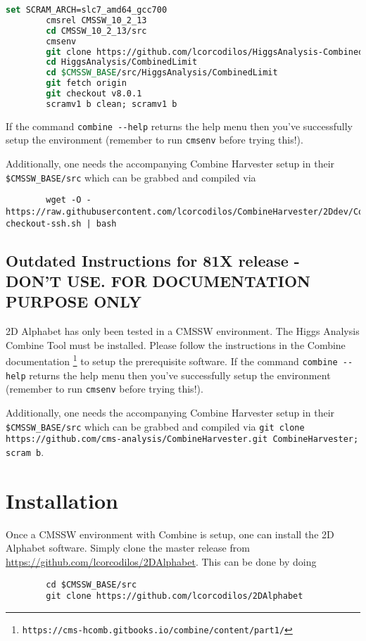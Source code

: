 \documentclass[letter]{article}
\begin{document}
    \begin{lstlisting}[language=csh]
        set SCRAM_ARCH=slc7_amd64_gcc700
        cmsrel CMSSW_10_2_13
        cd CMSSW_10_2_13/src
        cmsenv
        git clone https://github.com/lcorcodilos/HiggsAnalysis-CombinedLimit.git HiggsAnalysis/CombinedLimit
        cd HiggsAnalysis/CombinedLimit
        cd $CMSSW_BASE/src/HiggsAnalysis/CombinedLimit
        git fetch origin
        git checkout v8.0.1
        scramv1 b clean; scramv1 b
    \end{lstlisting}

    If the command \verb"combine --help" returns the help menu then you've successfully setup the environment (remember to run \verb"cmsenv" before trying this!).

    Additionally, one needs the accompanying Combine Harvester setup in their \verb"$CMSSW_BASE/src" which can be grabbed and compiled via 

    \begin{lstlisting}
        wget -O - https://raw.githubusercontent.com/lcorcodilos/CombineHarvester/2Ddev/CombineTools/scripts/sparse-checkout-ssh.sh | bash
    \end{lstlisting}

    \subsection{Outdated Instructions for 81X release - DON'T USE. FOR DOCUMENTATION PURPOSE ONLY}
    2D Alphabet has only been tested in a CMSSW environment. The Higgs Analysis Combine Tool must be installed. Please follow the instructions in the Combine documentation \footnote{\verb"https://cms-hcomb.gitbooks.io/combine/content/part1/"} to setup the prerequisite software. If the command \verb"combine --help" returns the help menu then you've successfully setup the environment (remember to run \verb"cmsenv" before trying this!).

    Additionally, one needs the accompanying Combine Harvester setup in their \verb"$CMSSW_BASE/src" which can be grabbed and compiled via \verb"git clone https://github.com/cms-analysis/CombineHarvester.git CombineHarvester; scram b".

\section{Installation}

    Once a CMSSW environment with Combine is setup, one can install the 2D Alphabet software. Simply clone the master release from \url{https://github.com/lcorcodilos/2DAlphabet}. This can be done by doing
    \begin{lstlisting}
        cd $CMSSW_BASE/src
        git clone https://github.com/lcorcodilos/2DAlphabet
    \end{lstlisting}
    
\end{document}
